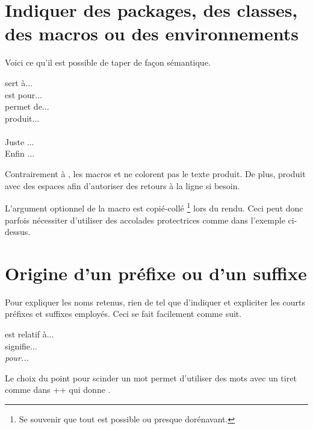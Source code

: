 \documentclass[theme = color]{tutodoc}
\begin{document}
\section{Indiquer des packages, des classes, des macros ou des environnements}

Voici ce qu'il est possible de taper de façon sémantique.


\begin{tdoclatex}[sbs]
 sert à...           \\
 est pour...      \\
 permet de...      \\
 produit...               \\
          \\
Juste ...                \\
Enfin ...
\end{tdoclatex}


\begin{tdocrem}
    Contrairement à , les macros  et  ne colorent pas le texte produit.
    De plus,  produit  avec des espaces afin d'autoriser des retours à la ligne si besoin.
\end{tdocrem}


\begin{tdocwarn}
    L'argument optionnel de la macro  est copié-collé
    \footnote{
        Se souvenir que tout est possible ou presque dorénavant.
    }
    lors du rendu. Ceci peut donc parfois nécessiter d'utiliser des accolades protectrices comme dans l'exemple ci-dessus.
\end{tdocwarn}



\section{Origine d'un préfixe ou d'un suffixe}

Pour expliquer les noms retenus, rien de tel que d'indiquer et expliciter les courts préfixes et suffixes employés. Ceci se fait facilement comme suit.


\begin{tdoclatex}[sbs]
 est relatif à...    \\
 signifie... \\
\emph{ pour...}
\end{tdoclatex}


\begin{tdocrem}
    Le choix du point pour scinder un mot permet d'utiliser des mots avec un tiret comme dans \tdocinlatex++ qui donne .
\end{tdocrem}
\end{document}
